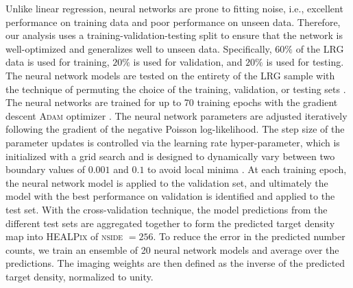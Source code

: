 Unlike linear regression, neural networks are prone to fitting noise, i.e., excellent performance on training data and poor performance on unseen data. Therefore, our analysis uses a training-validation-testing split to ensure that the network is well-optimized and generalizes well to unseen data. Specifically, $60\%$ of the LRG data is used for training, $20\%$ is used for validation, and $20\%$ is used for testing. The neural network models are tested on the entirety of the LRG sample with the technique of permuting the choice of the training, validation, or testing sets \citep{arlot2010survey}. The neural networks are trained for up to 70 training epochs with the gradient descent \textsc{Adam} optimizer \citep{2017arXiv171105101L}. The neural network parameters are adjusted iteratively following the gradient of the negative Poisson log-likelihood. The step size of the parameter updates is controlled via the learning rate hyper-parameter, which is initialized with a grid search and is designed to dynamically vary between two boundary values of $0.001$ and $0.1$ to avoid local minima \citep[see, also,][]{2016arXiv160803983L}. At each training epoch, the neural network model is applied to the validation set, and ultimately the model with the best performance on validation is identified and applied to the test set. With the cross-validation technique, the model predictions from the different test sets are aggregated together to form the predicted target density map into \textsc{HEALPix} of \textsc{nside} $=256$. To reduce the error in the predicted number counts, we train an ensemble of 20 neural network models and average over the predictions. The imaging weights are then defined as the inverse of the predicted target density, normalized to unity.

